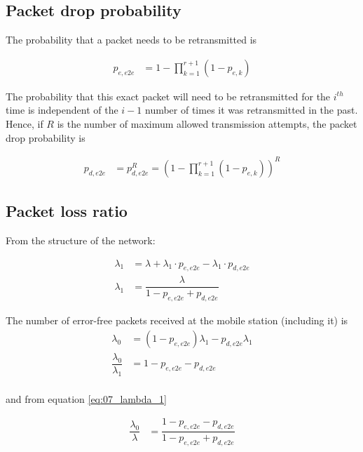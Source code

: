\subsection{Packet drop probability}

The probability that a packet needs to be retransmitted is

\begin{align*}
  p_{e,e2e} &= 1 - \prod_{k=1}^{r+1} (1 - p_{e,k})
\end{align*}

The probability that this exact packet will need to be retransmitted for the
$i^{th}$ time is independent of the $i-1$ number of times it was retransmitted
in the past. Hence, if $R$ is the number of maximum allowed transmission
attempts, the packet drop probability is

\begin{align*}
  p_{d,e2e} &= p_{d,e2e}^R = (1 - \prod_{k=1}^{r+1} (1 - p_{e,k}))^R
\end{align*}


\subsection{Packet loss ratio}

From the structure of the network:

\begin{align}
  \lambda_1 &= \lambda + \lambda_1 \cdot p_{e,e2e} - \lambda_1 \cdot p_{d,e2e} \nonumber \\
  \lambda_1 &= \dfrac{\lambda}{1 - p_{e,e2e} + p_{d,e2e}} \label{eq:07_lambda_1}
\end{align}

The number of error-free packets received at the mobile station (including it)
is
\begin{align*}
  \lambda_0 &= (1 - p_{e,e2e}) \lambda_1 - p_{d,e2e} \lambda_1 \\
  \dfrac{\lambda_0}{\lambda_1} &= 1 - p_{e,e2e} - p_{d,e2e} \\
\end{align*}

and from equation \ref{eq:07_lambda_1}

\begin{align*}
  \dfrac{\lambda_0}{\lambda} &= \dfrac{1 - p_{e,e2e} - p_{d,e2e}}{1 - p_{e,e2e} + p_{d,e2e}} \\
\end{align*}
